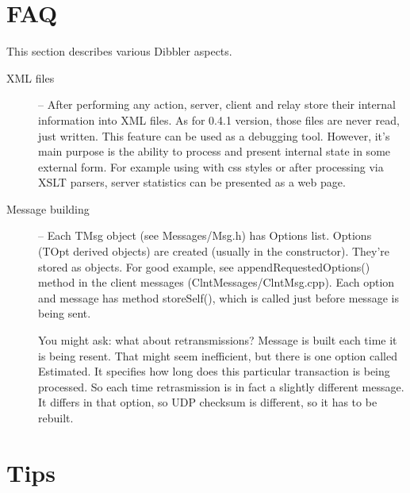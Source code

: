 
\section{FAQ}
This section describes various Dibbler aspects.

\begin{description}
\item[XML files] -- After performing any action, server, client and
relay store their internal information into XML files. As for 0.4.1
version, those files are never read, just written. This feature can be
used as a debugging tool. However, it's main purpose is the ability to
process and present internal state in some external form. For example
using with css styles or after processing via XSLT parsers, server
statistics can be presented as a web page.

\item[Message building] -- Each TMsg object (see Messages/Msg.h) has
Options list. Options (TOpt derived objects) are created (usually in
the constructor). They're stored as objects. For good example, see
appendRequestedOptions() method in the client messages
(ClntMessages/ClntMsg.cpp). Each option and message has method
storeSelf(), which is called just before message is being sent.

You might ask: what about retransmissions? Message is built each time
it is being resent. That might seem inefficient, but there is one
option called Estimated. It specifies how long does this particular
transaction is being processed. So each time retrasmission is in fact
a slightly different message. It differs in that option, so
UDP checksum is different, so it has to be rebuilt.
\end{description}

\section{Tips}


